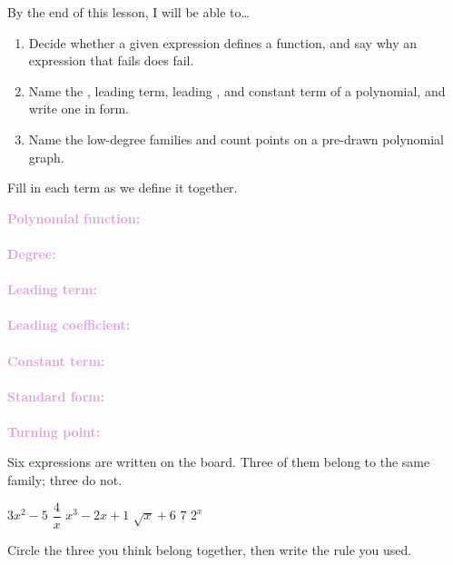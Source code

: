 \documentclass[10pt]{article}
\begin{document}

\vspace{0.12in}

\begin{objectivebox}
By the end of this lesson, I will be able to\ldots
\begin{enumerate}[itemsep=2pt]
  \item Decide whether a given expression defines a \blank{2.8cm} function, and
        say why an expression that fails does fail.
  \item Name the \blank{1.8cm}, leading term, leading \blank{2.6cm}, and constant
        term of a polynomial, and write one in \blank{2.6cm} form.
  \item Name the low-degree families and count \blank{2.4cm} points on a
        pre-drawn polynomial graph.
\end{enumerate}
\end{objectivebox}

\vspace{0.1in}

\boxguard
\begin{vocabbox}
Fill in each term as we define it together.
\par\vspace{2pt}
\noindent\textbf{\textcolor{plum}{Polynomial function:}}\\[1pt]
\writeline\\[3pt]
\noindent\textbf{\textcolor{plum}{Degree:}}\\[1pt]
\writeline\\[3pt]
\noindent\textbf{\textcolor{plum}{Leading term:}}\\[1pt]
\writeline\\[3pt]
\noindent\textbf{\textcolor{plum}{Leading coefficient:}}\\[1pt]
\writeline\\[3pt]
\noindent\textbf{\textcolor{plum}{Constant term:}}\\[1pt]
\writeline\\[3pt]
\noindent\textbf{\textcolor{plum}{Standard form:}}\\[1pt]
\writeline\\[3pt]
\noindent\textbf{\textcolor{plum}{Turning point:}}\\[1pt]
\writeline
\end{vocabbox}

\vspace{0.1in}

\boxguard
\begin{hookbox}
Six expressions are written on the board. Three of them belong to the same family;
three do not.

\begin{center}
$3x^2 - 5$ \qquad $\dfrac{4}{x}$ \qquad $x^3 - 2x + 1$ \qquad
$\sqrt{x} + 6$ \qquad $7$ \qquad $2^x$
\end{center}

Circle the three you think belong together, then write the rule you used.
\end{hookbox}
\end{document}
